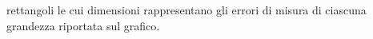 rettangoli le cui dimensioni rappresentano gli errori 
di misura di ciascuna grandezza riportata sul grafico.